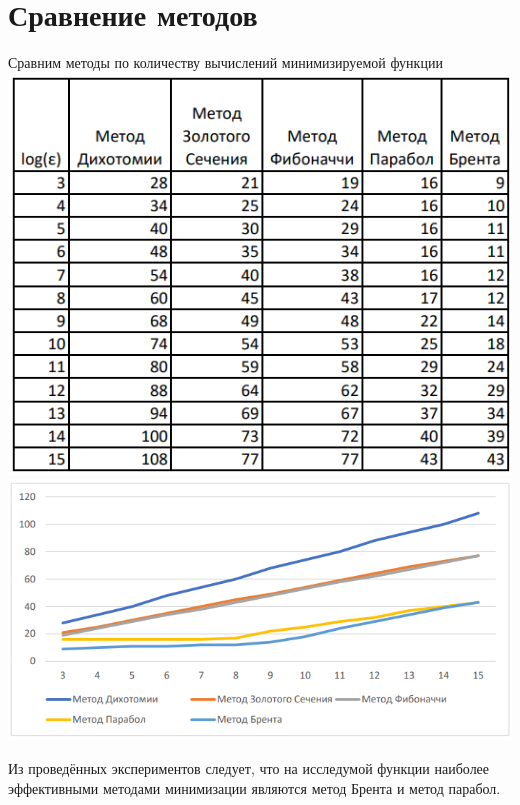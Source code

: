 \documentclass[a4paper,12pt]{article}
\begin{document}
\section{Сравнение методов}
Сравним методы по количеству вычислений минимизируемой функции
\includegraphics[width=\linewidth]{table_comp1.PNG}
\includegraphics[width=\linewidth]{table_comp2.PNG}

Из проведённых экспериментов следует, что на исследумой функции наиболее эффективными методами минимизации являются метод Брента и метод парабол.
\end{document}
